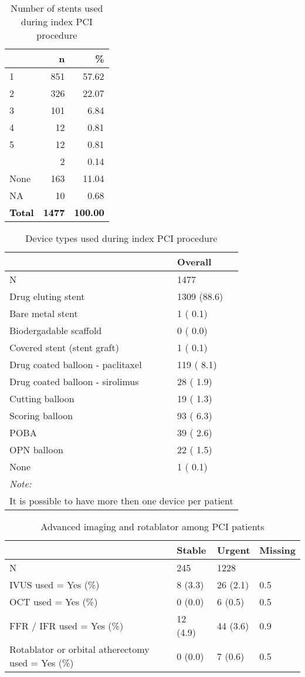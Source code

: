 \documentclass[
]{article}
\begin{document}
\begin{longtable}[t]{lrr}
\caption{\label{tab:table 30}Number of stents used during index PCI procedure}\\
\toprule
 & n & \%\\
\midrule
1 & 851 & 57.62\\
2 & 326 & 22.07\\
3 & 101 & 6.84\\
4 & 12 & 0.81\\
5 & 12 & 0.81\\
\addlinespace
6 & 2 & 0.14\\
None & 163 & 11.04\\
NA & 10 & 0.68\\
\textcolor{black}{\textbf{Total}} & \textcolor{black}{\textbf{1477}} & \textcolor{black}{\textbf{100.00}}\\
\bottomrule
\end{longtable}

\begin{longtable}[t]{ll}
\caption{\label{tab:table 31}Device types used during index PCI procedure}\\
\toprule
 & Overall\\
\midrule
N & 1477\\
Drug eluting stent & 1309 (88.6)\\
Bare metal stent & 1 ( 0.1)\\
Biodergadable scaffold & 0 ( 0.0)\\
Covered stent (stent graft) & 1 ( 0.1)\\
\addlinespace
Drug coated balloon  - paclitaxel & 119 ( 8.1)\\
Drug coated balloon  - sirolimus & 28 ( 1.9)\\
Cutting balloon & 19 ( 1.3)\\
Scoring balloon & 93 ( 6.3)\\
POBA & 39 ( 2.6)\\
\addlinespace
OPN balloon & 22 ( 1.5)\\
None & 1 ( 0.1)\\
\bottomrule
\multicolumn{2}{l}{\rule{0pt}{1em}\textit{Note: }}\\
\multicolumn{2}{l}{\rule{0pt}{1em}It is possible to have more then one device per patient}\\
\end{longtable}

\begin{longtable}[t]{llll}
\caption{\label{tab:table 32}Advanced imaging and rotablator among PCI patients}\\
\toprule
 & Stable & Urgent & Missing\\
\midrule
N & 245 & 1228 & \\
IVUS used = Yes (\%) & 8 (3.3) & 26 (2.1) & 0.5\\
OCT used = Yes (\%) & 0 (0.0) & 6 (0.5) & 0.5\\
FFR / IFR used  = Yes (\%) & 12 (4.9) & 44 (3.6) & 0.9\\
Rotablator or orbital atherectomy used  = Yes (\%) & 0 (0.0) & 7 (0.6) & 0.5\\
\bottomrule
\end{longtable}
\end{document}
